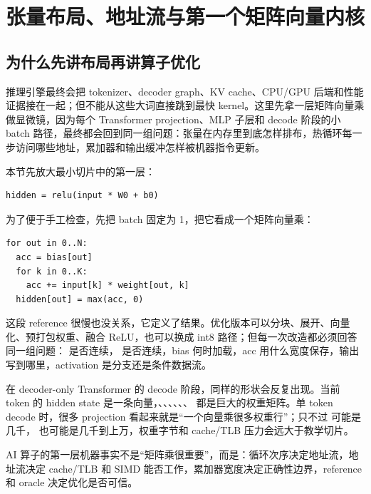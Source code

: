 \section{张量布局、地址流与第一个矩阵向量内核}

\subsection{为什么先讲布局再讲算子优化}

推理引擎最终会把 tokenizer、decoder graph、KV cache、CPU/GPU 后端和性能证据接在一起；但不能从这些大词直接跳到最快 kernel。这里先拿一层矩阵向量乘做显微镜，因为每个 Transformer projection、MLP 子层和 decode 阶段的小 batch 路径，最终都会回到同一组问题：张量在内存里到底怎样排布，热循环每一步访问哪些地址，累加器和输出缓冲怎样被机器指令更新。

本节先放大最小切片中的第一层：

\begin{lstlisting}[numbers=none,caption={本节先追踪这一层}]
hidden = relu(input * W0 + b0)
\end{lstlisting}

为了便于手工检查，先把 batch 固定为 1，把它看成一个矩阵向量乘：

\begin{lstlisting}[numbers=none,caption={矩阵向量乘的 reference 语义}]
for out in 0..N:
  acc = bias[out]
  for k in 0..K:
    acc += input[k] * weight[out, k]
  hidden[out] = max(acc, 0)
\end{lstlisting}

这段 reference 很慢也没关系，它定义了结果。优化版本可以分块、展开、向量化、预打包权重、融合 ReLU，也可以换成 int8 路径；但每一次改造都必须回答同一组问题： 是否连续， 是否连续，bias 何时加载，acc 用什么宽度保存，输出写到哪里，activation 是分支还是条件数据流。

在 decoder-only Transformer 的 decode 阶段，同样的形状会反复出现。当前 token 的 hidden state 是一条向量，、、、、、、 都是巨大的权重矩阵。单 token decode 时，很多 projection 看起来就是“一个向量乘很多权重行”；只不过  可能是几千， 也可能是几千到上万，权重字节和 cache/TLB 压力会远大于教学切片。

\begin{keyidea}
AI 算子的第一层机器事实不是“矩阵乘很重要”，而是：循环次序决定地址流，地址流决定 cache/TLB 和 SIMD 能否工作，累加器宽度决定正确性边界，reference 和 oracle 决定优化是否可信。
\end{keyidea}

